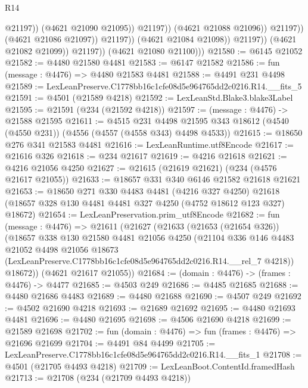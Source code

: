 \begin{lexlean}{R14}
\begin{coremodule}
                                          @21197))
                                      (@4621 @21090 @21095))
                                    @21197))
                                (@4621 @21088 @21096))
                              @21197))
                          (@4621 @21086 @21097))
                        @21197))
                    (@4621 @21084 @21098))
                  @21197))
              (@4621 @21082 @21099))
            @21197))
        (@4621 @21080 @21100)))
@21580 := @6145 @21052
@21582 := @4480 @21580 @4481
@21583 := @6147 @21582
@21586 := fun (message : @4476) => @4480 @21583 @4481
@21588 := @4491 @231 @4498
@21589 := LexLeanPreserve.C1778bb16c1cfe08d5e964765dd2c0216.R14.__fits_5
@21591 := @4501 (@21589 @4218)
@21592 := LexLeanStd.Blake3.blake3Label
@21595 := @21591 (@234 (@21592 @4218))
@21597 := (message : @4476) -> @21588 @21595
@21611 := @4515
    @231
    @4498
    @21595
    @343
    @18612
    (@4540 (@4550 @231))
    (@4556 (@4557 (@4558 @343) @4498 @4533))
@21615 := @18650 @276 @341 @21583 @4481
@21616 := LexLeanRuntime.utf8Encode
@21617 := @21616 @326
@21618 := @234 @21617
@21619 := @4216 @21618
@21621 := @4216 @21056 @4250
@21627 := @21615 (@21619 @21621) (@234 (@4576 @21617 @21055))
@21633 := @18657 @331 @340 @6146 @21582 @21618 @21621
@21653 := @18650
    @271
    @330
    @4483
    @4481
    (@4216 @327 @4250)
    @21618
    (@18657 @328 @130 @4481 @4481 @327 @4250 (@4752 @18612 @123 @327) @18672)
@21654 := LexLeanPreservation.prim_utf8Encode
@21682 := fun (message : @4476) =>
  @21611
    (@21627
      (@21633
        (@21653 (@21654 @326))
        (@18657
          @338
          @130
          @21580
          @4481
          @21056
          @4250
          (@21104
            @336
            @146
            @4483
            @21052
            @4498
            @21056
            @18673
            (LexLeanPreserve.C1778bb16c1cfe08d5e964765dd2c0216.R14.__rel_7 @4218))
          @18672))
      (@4621 @21617 @21055))
@21684 := (domain : @4476) -> (frames : @4476) -> @4477
@21685 := @4503 @249
@21686 := @4485 @21685
@21688 := @4480 @21686 @4483
@21689 := @4480 @21688
@21690 := @4507 @249
@21692 := @4502 @21690 @4218
@21693 := @21689 @21692
@21695 := @4480 @21693 @4481
@21696 := @4480 @21695
@21698 := @4506 @21690 @4218
@21699 := @21589 @21698
@21702 := fun (domain : @4476) => fun (frames : @4476) => @21696 @21699
@21704 := @4491 @84 @4499
@21705 := LexLeanPreserve.C1778bb16c1cfe08d5e964765dd2c0216.R14.__fits_1
@21708 := @4501 (@21705 @4493 @4218)
@21709 := LexLeanBoot.ContentId.framedHash
@21713 := @21708 (@234 (@21709 @4493 @4218))

\end{coremodule}
\end{lexlean}
